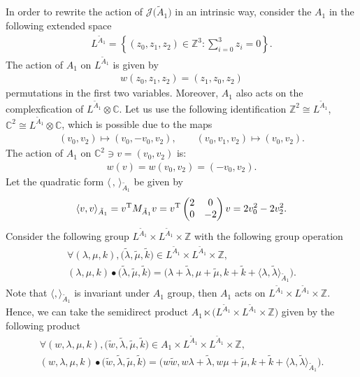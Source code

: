 \documentclass[pdftex]{sigma}%
\numberwithin{equation}{section}
\newcommand{\Ja}{\mathcal{J}}
\begin{document}
In order to rewrite the action of $\Ja\big(\tilde A_1\big)$ in an intrinsic way, consider the $A_1$ in the following extended space
\begin{gather*}
L^{\tilde A_1}=\left\{(z_0,z_1,z_2)\in \mathbb{Z}^{3}\colon \sum _{i=0}^3z_i=0 \right\}.
\end{gather*}
The action of $A_1$ on $L^{\tilde A_1}$ is given by
\begin{gather*}
w(z_0,z_1,z_2)=(z_{1},z_{0},z_2)
\end{gather*}
permutations in the first two variables. Moreover, $A_1$ also acts on the complexfication of $L^{\tilde A_1}\otimes\mathbb{C}$. Let us use the following identification $\mathbb{Z}^{2}\cong L^{\tilde A_1}$, $\mathbb{C}^{2}\cong L^{\tilde A_1}\otimes \mathbb{C}$, which is possible due to the maps
\begin{gather*}
(v_{0},v_2)\mapsto (v_{0},-v_0,v_2),\qquad
(v_{0},v_1,v_2)\mapsto (v_{0},v_2).
\end{gather*}
The action of $A_1$ on $\mathbb{C}^2 \ni v=(v_0,v_2)$ is:
\begin{gather*}
w(v)=w(v_0,v_2)=(-v_{0},v_2).
\end{gather*}
Let the quadratic form $\langle\,,\,\rangle_{\tilde A_1}$ be given by
\begin{gather}\label{invariant metric A1 t}
\langle v,v\rangle_{\tilde A_1}=v^{\rm T}M_{\tilde A_1}v
=v^{\rm T} \begin{pmatrix}2 & 0 \\0 & -2\\ \end{pmatrix}v=2v_0^2-2v_2^2.
\end{gather}
Consider the following group $L^{\tilde A_1}\times L^{\tilde A_1}\times \mathbb{Z}$ with the following group operation
\begin{gather*}
\forall (\lambda,\mu,k), \big(\tilde\lambda,\tilde\mu,\tilde k\big) \in L^{\tilde A_1}\times L^{\tilde A_1}\times \mathbb{Z},
\\
(\lambda,\mu,k)\bullet\big(\tilde\lambda,\tilde\mu,\tilde k\big)=\big(\lambda+\tilde\lambda,\mu+\tilde\mu,k+\tilde k+\langle \lambda,\tilde\lambda\rangle_{\tilde A_1}\big).
\end{gather*}
Note that $\langle ,\rangle_{\tilde A_1}$ is invariant under $A_1$ group, then $A_1$ acts on $L^{\tilde A_1}\times L^{\tilde A_1}\times \mathbb{Z}$. Hence, we can take the semidirect product $A_1\ltimes \big(L^{\tilde A_1}\times L^{\tilde A_1}\times \mathbb{Z}\big) $ given by the following product
\begin{gather*}
\forall (w,\lambda,\mu,k), \big(\tilde w,\tilde\lambda,\tilde\mu,\tilde k\big) \in A_1\times L^{\tilde A_1}\times L^{\tilde A_1}\times \mathbb{Z},
\\
(w,\lambda,\mu,k)\bullet\big(\tilde w,\tilde\lambda,\tilde\mu,\tilde k\big)=\big(w\tilde w,w\lambda+\tilde\lambda,w\mu+\tilde\mu,k+\tilde k+\langle\lambda,\tilde\lambda\rangle_{\tilde A_1}\big).
\end{gather*}
\end{document}
